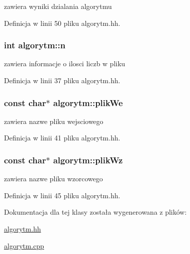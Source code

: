 zawiera wyniki dzialania algorytmu 



\-Definicja w linii 50 pliku algorytm.\-hh.

\hypertarget{classalgorytm_a2778c37f0ec06a30b7d494501c40e91a}{
\subsubsection[{n}]{\setlength{\rightskip}{0pt plus 5cm}int {\bf algorytm\-::n}}}\label{classalgorytm_a2778c37f0ec06a30b7d494501c40e91a}


zawiera informacje o ilosci liczb w pliku 



\-Definicja w linii 37 pliku algorytm.\-hh.

\hypertarget{classalgorytm_ab911ca0437df967d0240651855e5a2a3}{
\subsubsection[{plik\-We}]{\setlength{\rightskip}{0pt plus 5cm}const char$\ast$ {\bf algorytm\-::plik\-We}}}\label{classalgorytm_ab911ca0437df967d0240651855e5a2a3}


zawiera nazwe pliku wejsciowego 



\-Definicja w linii 41 pliku algorytm.\-hh.

\hypertarget{classalgorytm_a19c2be15efb3e5e34bf177d50b746d93}{
\subsubsection[{plik\-Wz}]{\setlength{\rightskip}{0pt plus 5cm}const char$\ast$ {\bf algorytm\-::plik\-Wz}}}\label{classalgorytm_a19c2be15efb3e5e34bf177d50b746d93}


zawiera nazwe pliku wzorcowego 



\-Definicja w linii 45 pliku algorytm.\-hh.



\-Dokumentacja dla tej klasy została wygenerowana z plików\-:\begin{DoxyCompactItemize}
\item 
\hyperlink{algorytm_8hh}{algorytm.\-hh}\item 
\hyperlink{algorytm_8cpp}{algorytm.\-cpp}\end{DoxyCompactItemize}
